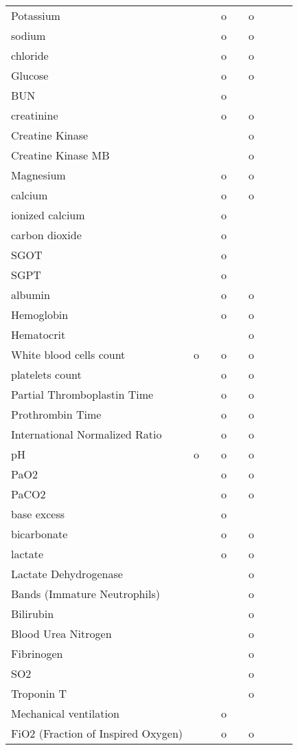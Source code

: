 \documentclass[a4paper,12pt]{article}
\begin{document}
\begin{longtable}{|p{3.5cm}|p{1cm}|p{1cm}|p{1cm}|p{1cm}|p{1cm}|p{1cm}|p{1cm}|p{1cm}|}
    \hline
    Potassium & & & o & & o & & & \\
    sodium & & & o & & o & & & \\
    chloride & & & o & & o & & & \\
    Glucose & & & o & & o & & & \\
    BUN & & & o & & & & & \\
    creatinine & & & o & & o & & & \\
    Creatine Kinase & & & & & o & & & \\
    Creatine Kinase MB & & & & & o & & & \\
    Magnesium & & & o & & o & & & \\
    calcium & & & o & & o & & & \\
    ionized calcium & & & o & & & & & \\
    carbon dioxide & & & o & & & & & \\
    SGOT & & & o & & & & & \\
    SGPT & & & o & & & & & \\
    albumin & & & o & & o & & & \\
    Hemoglobin & & & o & & o & & & \\
    Hematocrit & & & & & o & & & \\
    White blood cells count & o & & o & & o & & & \\
    platelets count & & & o & & o & & & \\
    Partial Thromboplastin Time & & & o & & o & & & \\
    Prothrombin Time & & & o & & o & & & \\
    International Normalized Ratio & & & o & & o & & & \\
    pH & o & & o & & o & & & \\
    PaO2 & & & o & & o & & & \\
    PaCO2 & & & o & & o & & & \\
    base excess & & & o & & & & & \\
    bicarbonate & & & o & & o & & & \\
    lactate & & & o & & o & & & \\
    Lactate Dehydrogenase & & & & & o & & & \\
    Bands (Immature Neutrophils) & & & & & o & & & \\
    Bilirubin & & & & & o & & & \\
    Blood Urea Nitrogen & & & & & o & & & \\
    Fibrinogen & & & & & o & & & \\
    SO2 & & & & & o & & & \\
    Troponin T & & & & & o & & & \\
    \hline
    Mechanical ventilation & & & o & & & & & \\
    FiO2 (Fraction of Inspired Oxygen) & & & o & & o & & & \\
    

\end{longtable}
\end{document}
